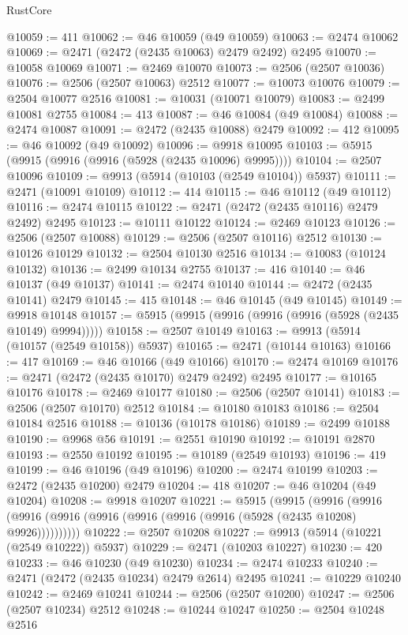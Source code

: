 \begin{lexlean}{RustCore}
\begin{coremodule}
@10059 := 411
@10062 := @46 @10059 (@49 @10059)
@10063 := @2474 @10062
@10069 := @2471 (@2472 (@2435 @10063) @2479 @2492) @2495
@10070 := @10058 @10069
@10071 := @2469 @10070
@10073 := @2506 (@2507 @10036)
@10076 := @2506 (@2507 @10063) @2512
@10077 := @10073 @10076
@10079 := @2504 @10077 @2516
@10081 := @10031 (@10071 @10079)
@10083 := @2499 @10081 @2755
@10084 := 413
@10087 := @46 @10084 (@49 @10084)
@10088 := @2474 @10087
@10091 := @2472 (@2435 @10088) @2479
@10092 := 412
@10095 := @46 @10092 (@49 @10092)
@10096 := @9918 @10095
@10103 := @5915 (@9915 (@9916 (@9916 (@5928 (@2435 @10096) @9995))))
@10104 := @2507 @10096
@10109 := @9913 (@5914 (@10103 (@2549 @10104)) @5937)
@10111 := @2471 (@10091 @10109)
@10112 := 414
@10115 := @46 @10112 (@49 @10112)
@10116 := @2474 @10115
@10122 := @2471 (@2472 (@2435 @10116) @2479 @2492) @2495
@10123 := @10111 @10122
@10124 := @2469 @10123
@10126 := @2506 (@2507 @10088)
@10129 := @2506 (@2507 @10116) @2512
@10130 := @10126 @10129
@10132 := @2504 @10130 @2516
@10134 := @10083 (@10124 @10132)
@10136 := @2499 @10134 @2755
@10137 := 416
@10140 := @46 @10137 (@49 @10137)
@10141 := @2474 @10140
@10144 := @2472 (@2435 @10141) @2479
@10145 := 415
@10148 := @46 @10145 (@49 @10145)
@10149 := @9918 @10148
@10157 := @5915 (@9915 (@9916 (@9916 (@9916 (@5928 (@2435 @10149) @9994)))))
@10158 := @2507 @10149
@10163 := @9913 (@5914 (@10157 (@2549 @10158)) @5937)
@10165 := @2471 (@10144 @10163)
@10166 := 417
@10169 := @46 @10166 (@49 @10166)
@10170 := @2474 @10169
@10176 := @2471 (@2472 (@2435 @10170) @2479 @2492) @2495
@10177 := @10165 @10176
@10178 := @2469 @10177
@10180 := @2506 (@2507 @10141)
@10183 := @2506 (@2507 @10170) @2512
@10184 := @10180 @10183
@10186 := @2504 @10184 @2516
@10188 := @10136 (@10178 @10186)
@10189 := @2499 @10188
@10190 := @9968 @56
@10191 := @2551 @10190
@10192 := @10191 @2870
@10193 := @2550 @10192
@10195 := @10189 (@2549 @10193)
@10196 := 419
@10199 := @46 @10196 (@49 @10196)
@10200 := @2474 @10199
@10203 := @2472 (@2435 @10200) @2479
@10204 := 418
@10207 := @46 @10204 (@49 @10204)
@10208 := @9918 @10207
@10221 := @5915
    (@9915
      (@9916 (@9916 (@9916 (@9916 (@9916 (@9916 (@9916 (@9916 (@5928 (@2435 @10208) @9926))))))))))
@10222 := @2507 @10208
@10227 := @9913 (@5914 (@10221 (@2549 @10222)) @5937)
@10229 := @2471 (@10203 @10227)
@10230 := 420
@10233 := @46 @10230 (@49 @10230)
@10234 := @2474 @10233
@10240 := @2471 (@2472 (@2435 @10234) @2479 @2614) @2495
@10241 := @10229 @10240
@10242 := @2469 @10241
@10244 := @2506 (@2507 @10200)
@10247 := @2506 (@2507 @10234) @2512
@10248 := @10244 @10247
@10250 := @2504 @10248 @2516

\end{coremodule}
\end{lexlean}
